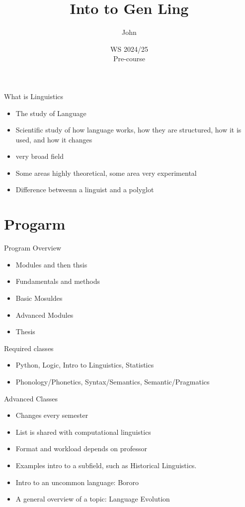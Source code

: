 \documentclass[aspectratio=169,hyperref={unicode}]{beamer}
\title{Into to Gen Ling}
\author{John}
\institute{Fachschaft General \& Computational Linguistics\\ \textbf{University of Tübingen}}
\date{WS 2024/25 \\ Pre-course}
\begin{document}
\frame{\titlepage}


\begin{frame}{What is Linguistics}
  \begin{itemize}
\item The study of Language
          \item Scientific study of how language works, how they are structured, how it is used, and how it changes
    \item very broad field
          \item Some areas highly theoretical, some area very experimental
          \item Difference betweenn a linguist and a polyglot
  \end{itemize}
\end{frame}

\section{Progarm}

\begin{frame}{Program Overview}
  \begin{itemize}
    \item Modules and then thsis
    \item Fundamentals and methods
    \item Basic Mosuldes
    \item Advanced Modules
          \item Thesis
  \end{itemize}

\end{frame}

\begin{frame}{Required classes}
\begin{itemize}
  \item Python, Logic, Intro to Linguistics, Statistics
        \item Phonology/Phonetics, Syntax/Semantics, Semantic/Pragmatics
\end{itemize}

\end{frame}
\begin{frame}{Advanced Classes}
  \begin{itemize}
  \item Changes every semester
  \item List is shared with computational linguistics
  \item Format and workload depends on professor
  \item Examples intro to a subfield, such as Historical Linguistics.
  \item Intro to an uncommon language: Bororo
  \item A general overview of a topic: Language Evolution
  \end{itemize}
\end{frame}
\end{document}
